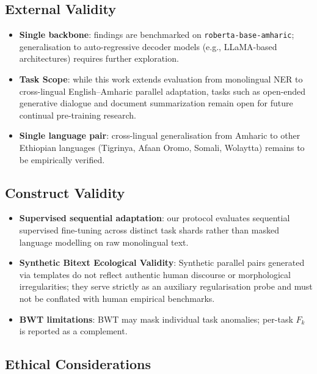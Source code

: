 \documentclass[11pt,a4paper]{article}
\begin{document}
\subsection{External Validity}

\begin{itemize}
  \item \textbf{Single backbone}: findings are benchmarked on \texttt{roberta-base-amharic};
        generalisation to auto-regressive decoder models (e.g., LLaMA-based architectures)
        requires further exploration.
  \item \textbf{Task Scope}: while this work extends evaluation from monolingual
        NER to cross-lingual English--Amharic parallel adaptation, tasks such
        as open-ended generative dialogue and document summarization remain
        open for future continual pre-training research.
  \item \textbf{Single language pair}: cross-lingual generalisation from Amharic
        to other Ethiopian languages (Tigrinya, Afaan Oromo, Somali, Wolaytta)
        remains to be empirically verified.
\end{itemize}

\subsection{Construct Validity}

\begin{itemize}
  \item \textbf{Supervised sequential adaptation}: our protocol evaluates
        sequential supervised fine-tuning across distinct task shards
        rather than masked language modelling on raw monolingual text.
  \item \textbf{Synthetic Bitext Ecological Validity}: Synthetic parallel
        pairs generated via templates do not reflect authentic human
        discourse or morphological irregularities; they serve strictly
        as an auxiliary regularisation probe and must not be conflated with
        human empirical benchmarks.
  \item \textbf{BWT limitations}: BWT may mask individual task
        anomalies; per-task $F_k$ is reported as a complement.
\end{itemize}

\subsection{Ethical Considerations}
\end{document}
